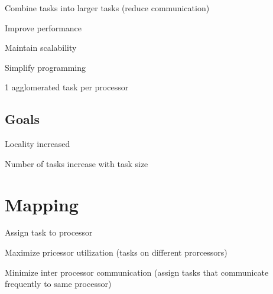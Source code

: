 \documentclass[12pt]{article}
\begin{document}
\begin{spacing}{1.5}
\begin{itemize*}
	\item Combine tasks into larger tasks (reduce communication)
	\item Improve performance
	\item Maintain scalability
	\item Simplify programming
	\item 1 agglomerated task per processor
\end{itemize*}

\subsection{Goals}

\begin{itemize*}
	\item Locality increased
	\item Number of tasks increase with task size
\end{itemize*}


\section{Mapping}

\begin{itemize*}
	\item Assign task to processor
	\item Maximize pricessor utilization (tasks on different prorcessors)
	\item Minimize inter processor communication (assign tasks that communicate frequently to same processor)
\end{itemize*}


\end{spacing}
\end{document}
